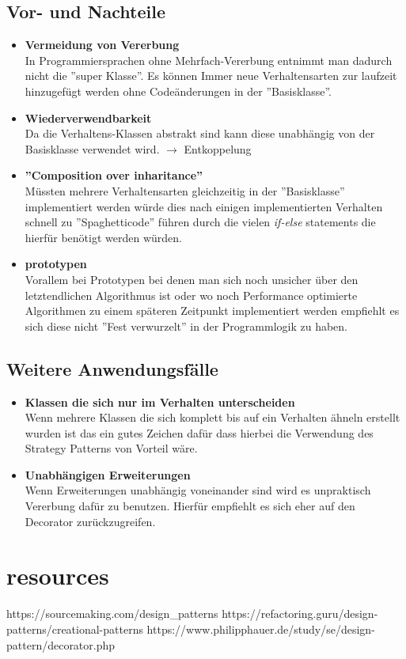\subsection{Vor- und Nachteile}
\begin{itemize}
	\item \textbf{Vermeidung von Vererbung} \\ 
	In Programmiersprachen ohne Mehrfach-Vererbung entnimmt man dadurch nicht die ''super Klasse''. Es können Immer neue Verhaltensarten zur laufzeit hinzugefügt werden ohne Codeänderungen in der ''Basisklasse''. 
	\item \textbf{Wiederverwendbarkeit}\\
	Da die Verhaltens-Klassen abstrakt sind kann diese unabhängig von der Basisklasse verwendet wird. $\rightarrow$ Entkoppelung
	\item \textbf{''Composition over inharitance''}\\
	Müssten mehrere Verhaltensarten gleichzeitig in der ''Basisklasse'' implementiert werden würde dies nach einigen implementierten Verhalten schnell zu ''Spaghetticode'' führen durch die vielen \textit{if-else} statements die hierfür benötigt werden würden. 
	\item \textbf{prototypen}\\
	Vorallem bei Prototypen bei denen man sich noch unsicher über den letztendlichen Algorithmus ist oder wo noch Performance optimierte Algorithmen zu einem späteren Zeitpunkt implementiert werden empfiehlt es sich diese nicht ''Fest verwurzelt'' in der Programmlogik zu haben. 
\end{itemize}



\subsection{Weitere Anwendungsfälle}
\begin{itemize}
	\item \textbf{Klassen die sich nur im Verhalten unterscheiden}\\
	Wenn mehrere Klassen die sich komplett bis auf ein Verhalten ähneln erstellt wurden ist das ein gutes Zeichen dafür dass hierbei die Verwendung des Strategy Patterns von Vorteil wäre.
	
	\item \textbf{Unabhängigen Erweiterungen}\\
	Wenn Erweiterungen unabhängig voneinander sind wird es unpraktisch Vererbung dafür zu benutzen. Hierfür empfiehlt es sich eher auf den Decorator zurückzugreifen.
	
\end{itemize}

\clearpage
\section{resources}
https://sourcemaking.com/design\_patterns
https://refactoring.guru/design-patterns/creational-patterns
https://www.philipphauer.de/study/se/design-pattern/decorator.php

